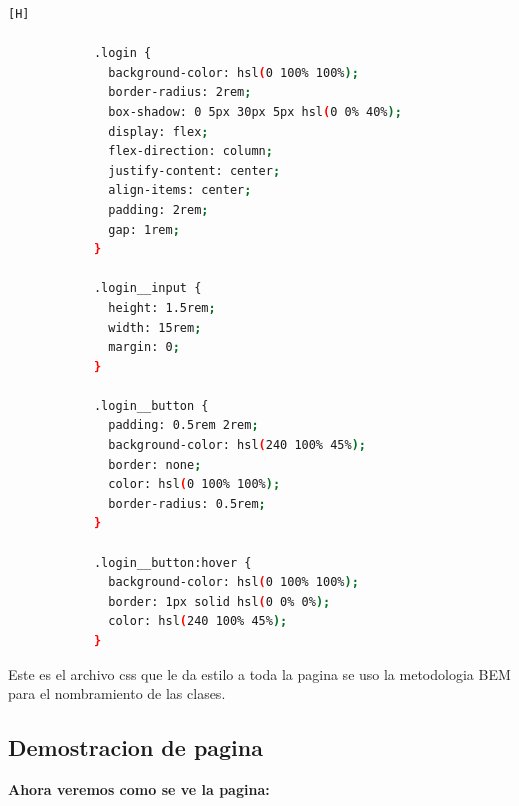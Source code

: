 \documentclass{article}
\begin{document}
\begin{lstlisting}[language=bash,caption={index.css}][H]
            
            .login {
              background-color: hsl(0 100% 100%);
              border-radius: 2rem;
              box-shadow: 0 5px 30px 5px hsl(0 0% 40%);
              display: flex;
              flex-direction: column;
              justify-content: center;
              align-items: center;
              padding: 2rem;
              gap: 1rem;
            }
            
            .login__input {
              height: 1.5rem;
              width: 15rem;
              margin: 0;
            }
            
            .login__button {
              padding: 0.5rem 2rem;
              background-color: hsl(240 100% 45%);
              border: none;
              color: hsl(0 100% 100%);
              border-radius: 0.5rem;
            }
            
            .login__button:hover {
              background-color: hsl(0 100% 100%);
              border: 1px solid hsl(0 0% 0%);
              color: hsl(240 100% 45%);
            }
	\end{lstlisting}
 
            Este es el archivo css que le da estilo a toda la pagina se uso la metodologia BEM para el nombramiento de las clases.
        
        \subsection{Demostracion de pagina}
            \textbf{Ahora veremos como se ve la pagina:}\\
            
\end{document}
